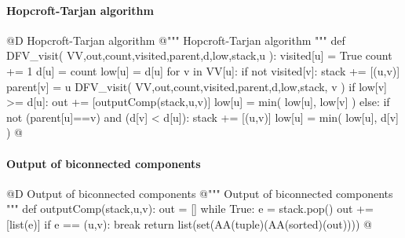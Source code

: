 \documentclass[11pt,oneside]{article}    %
\begin{document}
\paragraph{Hopcroft-Tarjan algorithm}
@D Hopcroft-Tarjan algorithm
@{""" Hopcroft-Tarjan algorithm """
def DFV_visit( VV,out,count,visited,parent,d,low,stack,u ):
    visited[u] = True
    count += 1
    d[u] = count
    low[u] = d[u]
    for v in VV[u]:
        if not visited[v]:
            stack += [(u,v)]
            parent[v] = u
            DFV_visit( VV,out,count,visited,parent,d,low,stack, v )
            if low[v] >= d[u]:
                out += [outputComp(stack,u,v)]
            low[u] = min( low[u], low[v] )
        else:
            if not (parent[u]==v) and (d[v] < d[u]):
                stack += [(u,v)]
                low[u] = min( low[u], d[v] )
@}


\paragraph{Output of biconnected components}
@D Output of biconnected components
@{""" Output of biconnected components """
def outputComp(stack,u,v):
    out = []
    while True:
        e = stack.pop()
        out += [list(e)]
        if e == (u,v): break
    return list(set(AA(tuple)(AA(sorted)(out))))
@}
\end{document}
